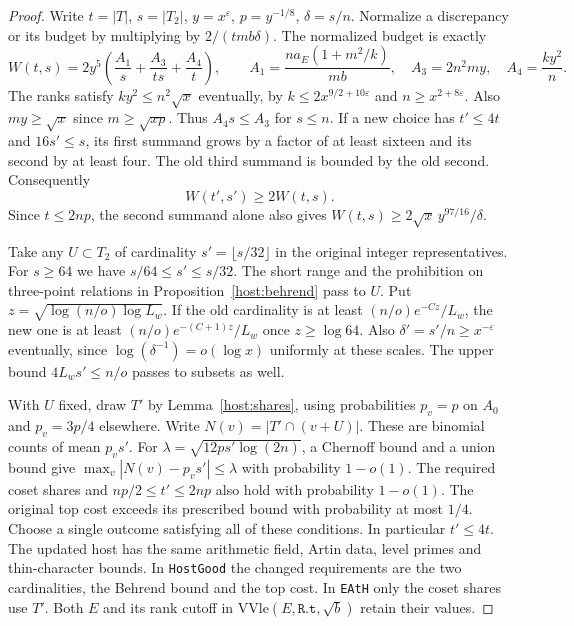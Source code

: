 \begin{proof}
Write \(t=|T|\), \(s=|T_2|\), \(y=x^\varepsilon\), \(p=y^{-1/8}\),
\(\delta=s/n\). Normalize a discrepancy or its budget by multiplying
by \(2/(tmb\delta)\). The normalized budget is exactly
\[
 W(t,s)=2y^5\left(\frac{A_1}{s}+\frac{A_3}{ts}+\frac{A_4}{t}\right),
 \qquad
 A_1=\frac{n a_E(1+m^2/k)}{mb},\quad
 A_3=2n^2my,\quad A_4=\frac{ky^2}{n}.
\]
The ranks satisfy \(ky^2\le n^2\sqrt{x}\) eventually, by
\(k\le2x^{9/2+10\varepsilon}\) and \(n\ge x^{2+8\varepsilon}\).
Also \(my\ge\sqrt{x}\) since \(m\ge\sqrt{xp}\). Thus
\(A_4s\le A_3\) for \(s\le n\). If a new choice has
\(t'\le4t\) and \(16s'\le s\), its first summand grows by a
factor of at least sixteen and its second by at least four.
The old third summand is bounded by the old second. Consequently
\[
                         W(t',s')\ge2W(t,s).
\]
Since \(t\le2np\), the second summand alone also gives
\(W(t,s)\ge 2\sqrt{x}\,y^{97/16}/\delta\).

Take any \(U\subset T_2\) of cardinality \(s'=\lfloor s/32\rfloor\)
in the original integer representatives. For \(s\ge64\) we have
\(s/64\le s'\le s/32\). The short range and the prohibition on
three-point relations in Proposition~\ref{host:behrend} pass to \(U\).
Put \(z=\sqrt{\log(n/o)\log L_w}\). If the old cardinality is at least
\((n/o)e^{-Cz}/L_w\), the new one is at least
\((n/o)e^{-(C+1)z}/L_w\) once \(z\ge\log64\). Also
\(\delta'=s'/n\ge x^{-\varepsilon}\) eventually, since
\(\log(\delta^{-1})=o(\log x)\) uniformly at these scales.
The upper bound \(4L_ws'\le n/o\) passes to subsets as well.

With \(U\) fixed, draw \(T'\) by Lemma~\ref{host:shares},
using probabilities \(p_v=p\) on \(A_0\) and \(p_v=3p/4\) elsewhere.
Write \(N(v)=|T'\cap(v+U)|\). These are binomial counts of mean
\(p_vs'\). For \(\lambda=\sqrt{12ps'\log(2n)}\), a Chernoff bound and a
union bound give \(\max_v|N(v)-p_vs'|\le\lambda\) with probability
\(1-o(1)\). The required coset shares and \(np/2\le t'\le2np\) also
hold with probability \(1-o(1)\). The original top cost exceeds its
prescribed bound with probability at most \(1/4\).
Choose a single outcome satisfying all of these conditions.
In particular \(t'\le4t\). The updated host has the same arithmetic
field, Artin data, level primes and thin-character bounds. In
\texttt{HostGood} the changed requirements are the two cardinalities,
the Behrend bound and the top cost. In \texttt{EAtH} only the coset
shares use \(T'\). Both \(E\) and its rank cutoff in
\(\mathrm{VVle}(E,\mathtt{R.t},\sqrt b)\) retain their values.


\end{proof}
